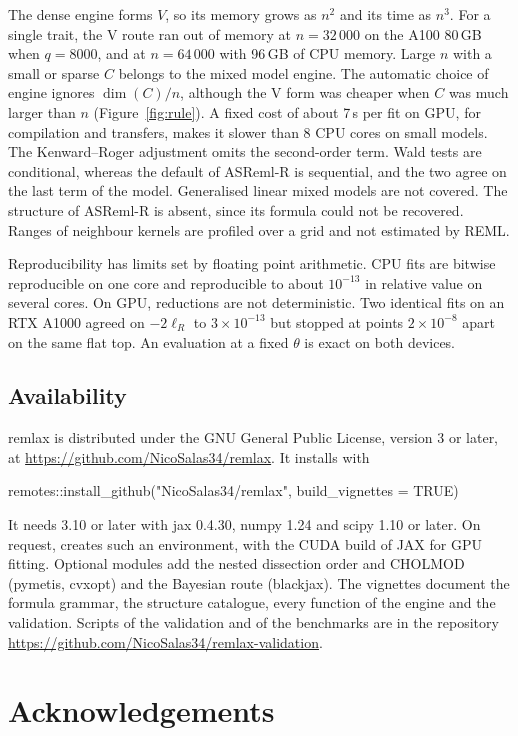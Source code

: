 \documentclass[article,nojss]{jss}
\renewcommand{\pkg}[1]{#1}
\newcommand{\dimC}{\operatorname{dim}}
\begin{document}
The dense engine forms $V$, so its memory grows as $n^2$ and its time as
$n^3$. For a single trait, the V route ran out of memory at $n = 32\,000$ on
the A100 80\,GB when $q = 8000$, and at $n = 64\,000$ with 96\,GB of CPU
memory. Large $n$ with a small or sparse $C$ belongs to the mixed model engine.
The automatic choice of engine ignores $\dimC(C)/n$, although the V form was
cheaper when $C$ was much larger than $n$ (Figure~\ref{fig:rule}). A fixed
cost of about 7\,s per fit on GPU, for compilation and transfers, makes it
slower than 8 CPU cores on small models. The Kenward--Roger adjustment omits
the second-order term. Wald tests are conditional, whereas the default of
\pkg{ASReml-R} is sequential, and the two agree on the last term of the model.
Generalised linear mixed models are not covered. The  structure of
\pkg{ASReml-R} is absent, since its formula could not be recovered. Ranges of
neighbour kernels are profiled over a grid and not estimated by REML.

Reproducibility has limits set by floating point arithmetic. CPU fits are
bitwise reproducible on one core and reproducible to about $10^{-13}$ in
relative value on several cores. On GPU, reductions are not deterministic.
Two identical fits on an RTX A1000 agreed on $-2\ell_R$ to $3 \times 10^{-13}$
but stopped at points $2 \times 10^{-8}$ apart on the same flat top. An
evaluation at a fixed $\theta$ is exact on both devices.

\subsection{Availability}

\pkg{remlax} is distributed under the GNU General Public License, version 3 or
later, at \url{https://github.com/NicoSalas34/remlax}. It installs with
\begin{Code}
remotes::install_github("NicoSalas34/remlax", build_vignettes = TRUE)
\end{Code}
It needs  3.10 or later with \pkg{jax} 0.4.30, \pkg{numpy}
1.24 and \pkg{scipy} 1.10 or later. On request, 
creates such an environment, with the CUDA build of \pkg{JAX} for GPU fitting.
Optional modules add the nested dissection order and \pkg{CHOLMOD}
(\pkg{pymetis}, \pkg{cvxopt}) and the Bayesian route (\pkg{blackjax}). The
vignettes document the formula grammar, the structure catalogue, every
function of the engine and the validation. Scripts of the validation and of
the benchmarks are in the repository
\url{https://github.com/NicoSalas34/remlax-validation}.

\section*{Acknowledgements}


\end{document}
